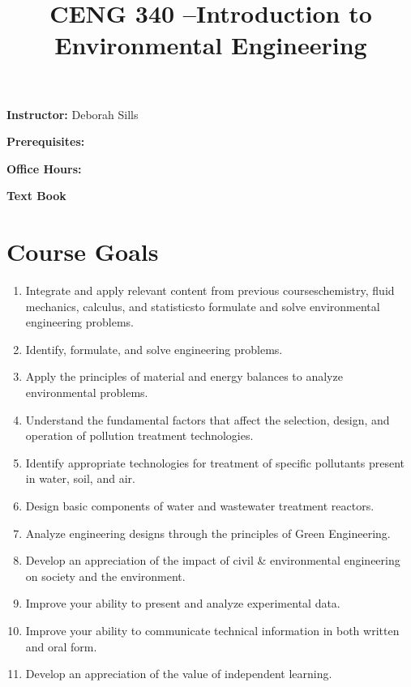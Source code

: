 \documentclass[a4paper, 12pt]{article}
\begin{document}
\title {\textbf{CENG 340 --Introduction to Environmental Engineering}} 

\maketitle

 {\bf Instructor:} Deborah Sills
 
 {\bf Prerequisites:}
 
 {\bf Office Hours:}
 
 {\bf Text Book}
 


\section *{Course Goals}
\begin{enumerate}
\item Integrate and apply relevant content from previous courses\textemdash chemistry, fluid mechanics, calculus, and statistics\textemdash to formulate and solve environmental engineering problems.
\item Identify, formulate, and solve engineering problems.
\item Apply the principles of material and energy balances to analyze environmental problems.
\item Understand the fundamental factors that affect the selection, design, and operation of pollution treatment technologies.
\item Identify appropriate technologies for treatment of specific pollutants present in water, soil, and air.
\item Design basic components of water and wastewater treatment reactors.
\item Analyze engineering designs through the principles of Green Engineering.
\item Develop an appreciation of the impact of civil \& environmental engineering on society and the environment.
\item Improve your ability to present and analyze experimental data. 
\item Improve your ability to communicate technical information in both written and oral form.
\item Develop an appreciation of the value of independent learning.

\end{enumerate}
\end{document}
